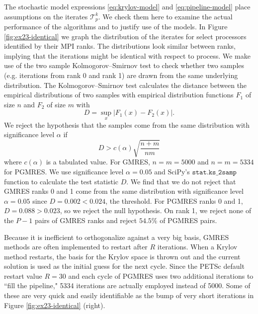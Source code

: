 \documentclass[sigconf, anonymous]{acmart}
\begin{document}
The stochastic model expressions \eqref{eq:krylov-model} and \eqref{eq:pipeline-model} place assumptions on the iterates $\mathcal{T}^k_p$. We check them here to examine the actual performance of the algorithms and to justify use of the models. 
In Figure \ref{fig:ex23-identical} we graph the distribution of the iterates for select processors identified by their MPI ranks. The distributions look similar between ranks, implying that the iterations might be identical with respect to process. We make use of the two sample Kolmogorov–Smirnov test to check whether two samples (e.g. iterations from rank 0 and rank 1) are drawn from the same underlying distribution. The Kolmogorov–Smirnov test calculates the distance between the empirical distributions of two samples with empirical distribution functions $F_1$ of size $n$ and $F_2$ of size $m$ with
$$ D = \sup_x |F_1(x) - F_2(x)|. $$
We reject the hypothesis that the samples come from the same distribution with significance level $\alpha$ if 
$$D > c(\alpha)\sqrt{\frac{n + m}{nm}}$$
where $c(\alpha)$ is a tabulated value. 
For GMRES, $n = m = 5000$ and $n = m = 5334$ for PGMRES. We use significance level $\alpha = 0.05$ and SciPy's ${\texttt{stat.ks\_2samp}}$ function to calculate the test statistic $D$.  
We find that we do not reject that GMRES ranks 0 and 1 come from the same distribution with significance level $\alpha = 0.05$ since $D = 0.002 < 0.024$, the threshold. For PGMRES ranks 0 and 1, $D = 0.088 > 0.023$, so we reject the null hypothesis. 
On rank 1, we reject none of the $P-1$ pairs of GMRES ranks and reject $54.5\%$ of PGMRES pairs.

Because it is inefficient to orthogonalize against a very big basis, GMRES methods are often implemented to restart after $R$ iterations. When a Krylov method restarts, the basis for the Krylov space is thrown out and the current solution is used as the initial guess for the next cycle.
Since the PETSc default restart value $R = 30$ and each cycle of PGMRES uses two additional iterations to ``fill the pipeline," 5334 iterations are actually employed instead of 5000. Some of these are very quick and easily identifiable as the bump of very short iterations in Figure \ref{fig:ex23-identical} (right). 
\end{document}
